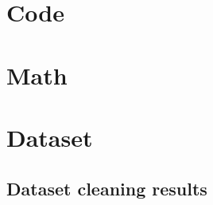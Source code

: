 \chapter{Code}

\chapter{Math}

\chapter{Dataset}

    \section{Dataset cleaning results}\label{sec:annexes:dataset_cleaning_results}
